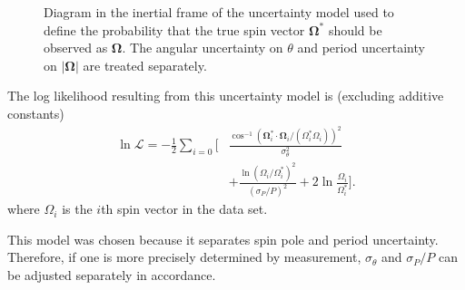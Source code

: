 \documentclass[fleqn,usenatbib]{mnras}
\newcommand{\unit}[1]{\bm{\hat{#1}}}
\newcommand{\parens}[1]{\left( #1 \right)}
\begin{document}
\begin{figure}
  \centering
  \caption{Diagram in the inertial frame of the uncertainty model used to define the probability that the true spin vector $\bm \Omega^*$ should be observed as $\bm \Omega$. The angular uncertainty on $\theta$ and period uncertainty on $|\bm \Omega|$ are treated separately.}
  \label{fig:uncertainty-model}
\end{figure}

The log likelihood resulting from this uncertainty model is (excluding additive constants)
\begin{equation}
  \begin{split}
  \ln \mathcal{L} = -\frac{1}{2}\sum_{i = 0}\Bigg[&\frac{\cos^{-1} (\bm \Omega_i^* \cdot \bm \Omega_i/(\Omega_i^* \Omega_i))^2}{\sigma_\theta^2}\\
  &+\frac{\ln \parens{\Omega_i /\Omega_i^*}^2}{(\sigma_P / P)^2} + 2\ln\frac{\Omega_i}{\Omega_i^*}\Bigg].
  \end{split}
  \label{eqn:log-likelihood}
\end{equation}
where $\Omega_i$ is the $i$th spin vector in the data set.

This model was chosen because it separates spin pole and period uncertainty. Therefore, if one is more precisely determined by measurement, $\sigma_\theta$ and $\sigma_P / P$ can be adjusted separately in accordance.
\end{document}
